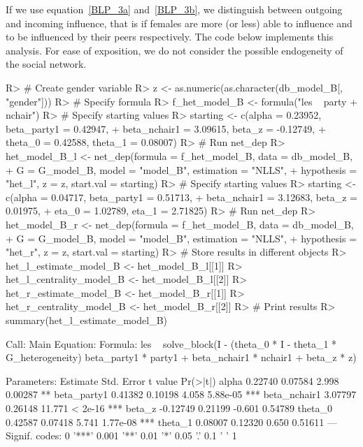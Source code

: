 \documentclass[nojss]{jss}
\begin{document}
	If we use equation~\ref{BLP_3a} and~\ref{BLP_3b}, we distinguish between outgoing and incoming influence, that is if females are more (or less) able to influence and to be influenced by their peers respectively. The code below implements this analysis. For ease of exposition, we do not consider the possible endogeneity of the social network.
	\begin{CodeChunk}
		\begin{CodeInput}
			R> # Create gender variable
			R> z <- as.numeric(as.character(db_model_B[, "gender"]))
			R> # Specify formula
			R> f_het_model_B <- formula("les ~ party + nchair")
			R> # Specify starting values
			R> starting <- c(alpha = 0.23952, beta_party1 = 0.42947,
			+    beta_nchair1 = 3.09615, beta_z = -0.12749,
			+    theta_0 = 0.42588, theta_1 = 0.08007)
			R> # Run net_dep
			R> het_model_B_l <- net_dep(formula = f_het_model_B, data = db_model_B,
			+    G = G_model_B, model = "model_B", estimation = "NLLS",
			+    hypothesis = "het_l", z = z, start.val = starting)
			R> # Specify starting values
			R> starting <- c(alpha = 0.04717, beta_party1 = 0.51713,
			+    beta_nchair1 = 3.12683, beta_z = 0.01975,
			+    eta_0 = 1.02789, eta_1 = 2.71825)
			R> # Run net_dep
			R> het_model_B_r <- net_dep(formula = f_het_model_B, data = db_model_B,
			+    G = G_model_B, model = "model_B", estimation = "NLLS",
			+    hypothesis = "het_r", z = z, start.val = starting)
			R> # Store results in different objects
			R> het_l_estimate_model_B <- het_model_B_l[[1]]
			R> het_l_centrality_model_B <- het_model_B_l[[2]]
			R> het_r_estimate_model_B <- het_model_B_r[[1]]
			R> het_r_centrality_model_B <- het_model_B_r[[2]]
			R> # Print results
			R> summary(het_l_estimate_model_B)
		\end{CodeInput}
		\begin{CodeOutput}
			Call:
			Main Equation:  
			Formula: les ~ solve_block(I - (theta_0 * I - 
			theta_1 * G_heterogeneity) %
			beta_party1 * party1 + beta_nchair1 * nchair1 + beta_z * z)
			
			Parameters:
			Estimate Std. Error t value Pr(>|t|)    
			alpha         0.22740    0.07584   2.998  0.00287 ** 
			beta_party1   0.41382    0.10198   4.058 5.88e-05 ***
			beta_nchair1  3.07797    0.26148  11.771  < 2e-16 ***
			beta_z       -0.12749    0.21199  -0.601  0.54789    
			theta_0       0.42587    0.07418   5.741 1.77e-08 ***
			theta_1       0.08007    0.12320   0.650  0.51611    
			---
			Signif. codes:  0 '***' 0.001 '**' 0.01 '*' 0.05 '.' 0.1 ' ' 1
			

\end{CodeOutput}
\end{CodeChunk}
\end{document}
